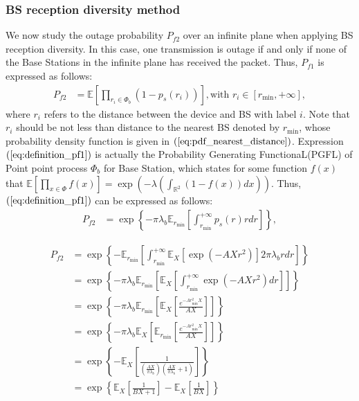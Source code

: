 \subsubsection{BS reception diversity method}
We now study the outage probability $P_{f2}$ over an infinite plane when applying BS reception diversity. In this case, one transmission is outage if and only if none of the Base Stations in the infinite plane has received the packet. Thus, $P_{f1}$ is expressed as follows:
\begin{align}
\label{eq:definition_pf1}
P_{f2} &= \mathbb{E}\left[  \prod_{r_i \in \Phi_{b}} (1-p_{s}(r_i)) \right], \text{with } r_i \in \left[ r_{\text{min}}, +\infty\right],
\end{align} 
where $r_i$ refers to the distance between the device and BS with label $i$. Note that $r_i$ should be not less than distance to the nearest BS denoted by $r_{\text{min}}$, whose probability density function is given in $(\ref{eq:pdf_nearest_distance})$. Expression $(\ref{eq:definition_pf1})$ is actually the Probability Generating FunctionaL(PGFL) of Point point process $\Phi_{b}$ for Base Station, which states for some function $f(x)$ that $\mathbb{E}\left[ \prod_{x \in \Phi}f(x) \right] = \exp(-\lambda(\int_{\mathbb{R}^2}(1-f(x))dx))$. Thus, $(\ref{eq:definition_pf1})$ can be expressed as follows:
\begin{align}
P_{f2} &= \exp\left\lbrace -\pi \lambda_{b} \mathbb{E}_{r_{\text{min}}} \left[ \int_{r_{\text{min}}}^{+\infty} p_{s}(r)rdr \right] \right\rbrace ,
\end{align} 

\begin{align}
P_{f2} &= \exp\left\lbrace -\mathbb{E}_{r_{\text{min}}} \left[ \int_{r_{\text{min}}}^{+\infty} \mathbb{E}_{X}\left[ \exp(-AXr^2)\right] 2\pi\lambda_{b} rdr \right] \right\rbrace \nonumber\\ 
&= \exp\left\lbrace -\pi \lambda_{b} \mathbb{E}_{r_{\text{min}}} \left[\mathbb{E}_{X}\left[ \int_{r_{\text{min}}}^{+\infty}\exp(-AXr^2)dr\right] \right] \right\rbrace \nonumber\\ 
&= \exp\left\lbrace -\pi \lambda_{b} \mathbb{E}_{r_{\text{min}}} \left[\mathbb{E}_{X}\left[ \frac{e^{-Ar_{\text{min}}^2X} }{AX} \right] \right] \right\rbrace \nonumber\\ 
&= \exp\left\lbrace -\pi \lambda_{b} \mathbb{E}_{X} \left[\mathbb{E}_{r_{\text{min}}}\left[ \frac{e^{-Ar_{\text{min}}^2X} }{AX} \right] \right] \right\rbrace \nonumber\\ 
&= \exp\left\lbrace -\mathbb{E}_{X} \left[ \frac{1}{\left( \frac{AX}{\pi\lambda_b}\right)\left( \frac{AX}{\pi\lambda_b}+1\right) }\right] \right\rbrace \nonumber\\ 
&= \exp\left\lbrace \mathbb{E}_{X} \left[ \frac{1}{BX + 1}\right] - \mathbb{E}_{X} \left[ \frac{1}{BX}\right]   \right\rbrace
\end{align}

